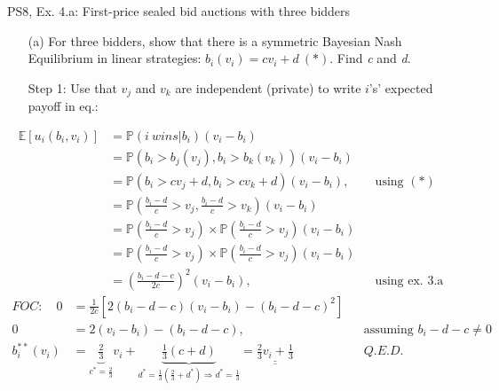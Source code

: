 \begin{frame}{PS8, Ex. 4.a: First-price sealed bid auctions with three bidders}
    \begin{itemize}
      \item[(a)] For three bidders, show that there is a symmetric Bayesian Nash Equilibrium in linear strategies: $b_i(v_i) = cv_i + d\ (*)$. Find \textit{c} and \textit{d}.
      \item[Step 1:] Use that $v_j$ and $v_k$ are independent (private) to write $i$'s' expected payoff in eq.:
    \end{itemize}
    \vspace{-10pt}
    \begin{align*}
      \mathbb{E}[u_i(b_i,v_i)]
      &=\mathbb{P}(i\ wins|b_i)(v_i-b_i)\\
      &=\mathbb{P}\left(b_i>b_j(v_j),b_i>b_k(v_k)\right)(v_i-b_i)\\
      &=\mathbb{P}(b_i>cv_j+d,b_i>cv_k+d)(v_i-b_i),&&\text{using }(*)\\
      &=\mathbb{P}\left(\frac{b_i-d}{c}>v_j,\frac{b_i-d}{c}>v_k\right)(v_i-b_i)\\
      &=\mathbb{P}\left(\frac{b_i-d}{c}>v_j\right)\times\mathbb{P}\left(\frac{b_i-d}{c}>v_j\right)(v_i-b_i)\\
      &=\mathbb{P}\left(\frac{b_i-d}{c}>v_j\right)\times\mathbb{P}\left(\frac{b_i-d}{c}>v_j\right)(v_i-b_i)\\
      &=\left(\frac{b_i-d-c}{2c}\right)^2(v_i-b_i),&&\text{using ex. 3.a}
    \end{align*}
    \vspace{-8pt}
    \begin{align*}
      FOC:\quad   0&=\frac{1}{2c}[2(b_i-d-c)(v_i-b_i)-(b_i-d-c)^2]\\
                  0&=2(v_i-b_i)-(b_i-d-c),&&\text{assuming }b_i-d-c\neq0\\
      b_i^{**}(v_i)&=\underbrace{\frac{2}{3}}_{c^{*}=\frac{2}{3}}v_i+\underbrace{\frac{1}{3}(c+d)}_{d^{*}=\frac{1}{3}\left(\frac{2}{3}+d^{*}\right)\Rightarrow d^{*}=\frac{1}{3}}=\underline{\underline{\frac{2}{3}v_i+\frac{1}{3}}}&&Q.E.D.
    \end{align*}
    \vfill\null
\end{frame}


